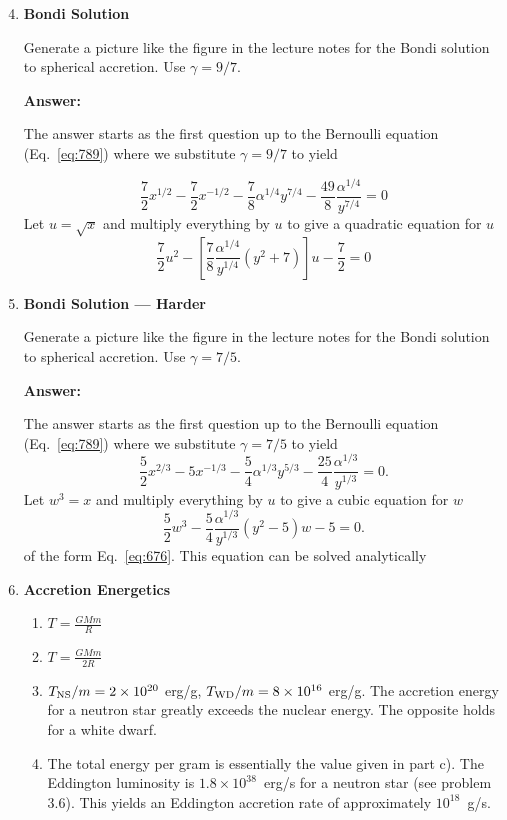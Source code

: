 \documentclass{article}
\begin{document}
\begin{enumerate}
\setcounter{enumi}{3}
\item{\bf Bondi Solution}

Generate a picture like the figure in the lecture notes for the Bondi
solution to spherical accretion.  Use $\gamma=9/7$.

{\bf Answer: }

The answer starts as the first question up to the Bernoulli equation
(Eq.~\ref{eq:789}) where we substitute $\gamma=9/7$ to yield

\begin{equation}
\frac{7}{2} x^{1/2} - \frac{7}{2} x^{-1/2} - \frac{7}{8} \alpha^{1/4}
y^{7/4} - \frac{49}{8} \frac{\alpha^{1/4}}{y^{7/4}} = 0
\end{equation}
Let $u=\sqrt{x}$ and multiply everything by $u$ to give a quadratic
equation for $u$
\begin{equation}
\frac{7}{2} u^2 - \left [ \frac{7}{8} \frac{\alpha^{1/4}}{y^{1/4}}
  (y^2 + 7 ) \right ]u -
\frac{7}{2} = 0
\end{equation}

\item{\bf Bondi Solution --- Harder}

Generate a picture like the figure in the lecture notes for the Bondi
solution to spherical accretion.  Use $\gamma=7/5$.

{\bf Answer: }

The answer starts as the first question up to the Bernoulli equation
(Eq.~\ref{eq:789}) where we substitute $\gamma=7/5$ to yield
\begin{equation}
\frac{5}{2} x^{2/3} - 5 x^{-1/3} - \frac{5}{4} \alpha^{1/3} y^{5/3} -
\frac{25}{4} \frac{\alpha^{1/3}}{y^{1/3}} = 0.
\end{equation}
Let $w^3=x$ and multiply everything by $u$ to give a cubic
equation for $w$
\begin{equation}
\frac{5}{2} w^3 - \frac{5}{4} \frac{\alpha^{1/3}}{y^{1/3}} \left ( y^2
  - 5 \right ) w - 5= 0.
\end{equation}
of the form Eq.~\ref{eq:676}.  This equation can be solved analytically

\item{\bf Accretion Energetics}

\begin{enumerate}
\item $T=\frac{G M m}{R}$
\item $T=\frac{G M m}{2 R}$
\item $T_\textrm{\scriptsize NS}/m=2 \times 10^{20}$ erg/g,
  $T_\textrm{\scriptsize WD}/m=8
  \times 10^{16}$ erg/g. The accretion energy for a neutron star
  greatly exceeds the nuclear energy.  The opposite holds for a white
  dwarf.
\item The total energy per gram is essentially the value given in part
  c).  The Eddington luminosity is $1.8\times 10^{38}$~erg/s for a
  neutron star (see problem 3.6).  This yields an Eddington accretion
  rate of approximately $10^{18}$~g/s. 
\end{enumerate}


\end{enumerate}
\end{document}
